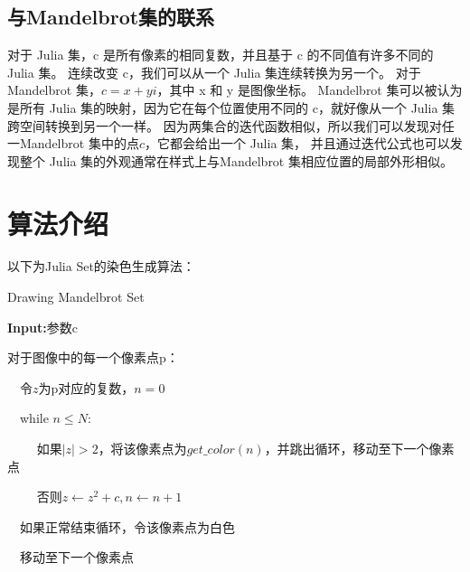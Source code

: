 \documentclass[UTF8]{ctexart}
\begin{document}
\subsection{与Mandelbrot集的联系}
对于 Julia 集，c 是所有像素的相同复数，并且基于 c 的不同值有许多不同的 Julia 集。
连续改变 c，我们可以从一个 Julia 集连续转换为另一个。
对于 Mandelbrot 集，$c = x + yi$，其中 x 和 y 是图像坐标。 
Mandelbrot 集可以被认为是所有 Julia 集的映射，因为它在每个位置使用不同的 c，就好像从一个 Julia 集跨空间转换到另一个一样。
因为两集合的迭代函数相似，所以我们可以发现对任一Mandelbrot 集中的点$c$，它都会给出一个 Julia 集，
并且通过迭代公式也可以发现整个 Julia 集的外观通常在样式上与Mandelbrot 集相应位置的局部外形相似。\cite{https://complex-analysis.com/}


\section{算法介绍}
以下为Julia Set的染色生成算法：
\begin{algorithm}
\caption{Drawing Mandelbrot Set}
\label{alg1}
\textbf{Input:}参数c\par
对于图像中的每一个像素点p：\par
$\quad$令$z$为p对应的复数，$n=0$\par
$\quad $while $n \le N$:\par
$\qquad$ 如果$|z| > 2$，将该像素点为$get\_color(n)$，并跳出循环，移动至下一个像素点\par
$\qquad$ 否则$z \leftarrow z^2 + c,n \leftarrow n+1$\par
$\quad$如果正常结束循环，令该像素点为白色\par
$\quad$移动至下一个像素点
\end{algorithm}
\end{document}
